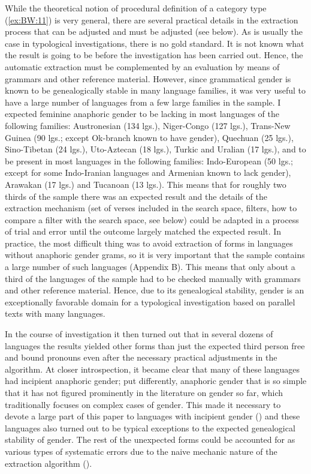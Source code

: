 \documentclass[output=collectionpaper]{langsci/langscibook}
\begin{document}
While the theoretical notion of procedural definition of a category type (\ref{ex:BW:11}) is very general, there are several practical details in the extraction process that can be adjusted and must be adjusted (see below). As is usually the case in typological investigations, there is no gold standard. It is not known what the result is going to be before the investigation has been carried out. Hence, the automatic extraction must be complemented by an evaluation by means of grammars and other reference material. However, since grammatical gender is known to be genealogically stable in many language families, it was very useful to have a large number of languages from a few large families in the sample. I expected feminine anaphoric gender to be lacking in most languages of the following families: Austronesian (134 lgs.), Niger-Congo (127 lgs.), Trans-New Guinea (90 lgs.; except Ok-branch known to have gender), Quechuan (25 lgs.), Sino-Tibetan (24 lgs.), Uto-Aztecan (18 lgs.), Turkic and Uralian (17 lgs.), and to be present in most languages in the following families: Indo-European (50 lgs.; except for some Indo-Iranian languages and Armenian known to lack gender), Arawakan (17 lgs.\@) and Tucanoan (13 lgs.). This means that for roughly two thirds of the sample there was an expected result and the details of the extraction mechanism (set of verses included in the search space, filters, how to compare a filter with the search space, see below) could be adapted in a process of trial and error until the outcome largely matched the expected result. In practice, the most difficult thing was to avoid extraction of forms in languages without anaphoric gender grams, so it is very important that the sample contains a large number of such languages (Appendix B). This means that only about a third of the languages of the sample had to be checked manually with grammars and other reference material. Hence, due to its genealogical stability, gender is an exceptionally favorable domain for a typological investigation based on parallel texts with many languages.

In the course of investigation it then turned out that in several dozens of languages the results yielded other forms than just the expected third person free and bound pronouns even after the necessary practical adjustments in the algorithm. At closer introspection, it became clear that many of these languages had incipient anaphoric gender; put differently, anaphoric gender that is so simple that it has not figured prominently in the literature on gender so far, which traditionally focuses on complex cases of gender. This made it necessary to devote a large part of this paper to languages with incipient gender () and these languages also turned out to be typical exceptions to the expected genealogical stability of gender. The rest of the unexpected forms could be accounted for as various types of systematic errors due to the naive mechanic nature of the extraction algorithm ().
\end{document}
